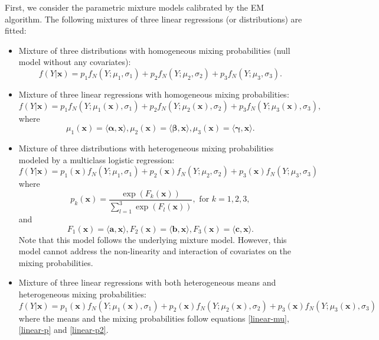\documentclass[11pt]{article}
\numberwithin{equation}{section}
\def\bx{\boldsymbol{x}}
\begin{document}
First, we  consider the parametric mixture models calibrated by the EM algorithm. The following mixtures of three linear regressions (or distributions) are fitted:
\begin{itemize}
	\item 	Mixture of three distributions with homogeneous mixing probabilities (null model without any covariates):
	\begin{equation}\label{gaussian-0}
		f(Y|\bx)=p_1f_N(Y;\mu_1,\sigma_1)+p_2f_N(Y;\mu_2,\sigma_2)+p_3f_N(Y;\mu_3,\sigma_3).
	\end{equation}

	\item 	Mixture of three linear regressions with homogeneous mixing probabilities:
\begin{equation}\label{gaussian-glm-mu}
	f(Y|\bx)=p_1f_N(Y;\mu_1(\bx),\sigma_1)+p_2f_N(Y;\mu_2(\bx),\sigma_2)+p_3f_N(Y;\mu_3(\bx),\sigma_3),
\end{equation}
where
\begin{equation}\label{linear-mu}
	\mu_1(\bx)=\langle\boldsymbol{\alpha},\bx\rangle, \mu_2(\bx)=\langle\boldsymbol{\beta},\bx\rangle,\mu_3(\bx)=\langle\boldsymbol{\gamma},\bx\rangle.
\end{equation}

\item 	Mixture of three distributions with heterogeneous mixing probabilities modeled by a multiclass logistic regression:
\begin{equation}\label{gaussian-glm-p}
	f(Y|\bx)=p_1(\bx)f_N(Y;\mu_1,\sigma_1)+p_2(\bx)f_N(Y;\mu_2,\sigma_2)+p_3(\bx)f_N(Y;\mu_3,\sigma_3)
\end{equation}
where
\begin{equation}\label{linear-p}
	p_k(\bx)=\frac{\exp\left(F_k(\bx)\right)}{\sum_{l=1}^{3}\exp\left(F_l(\bx)\right)}, \text{ for } k=1,2,3,
\end{equation}
and 
\begin{equation}\label{linear-p2}
	F_1(\bx)=\langle \boldsymbol{a},\bx\rangle, F_2(\bx)=\langle \boldsymbol{b},\bx\rangle,F_3(\bx)=\langle \boldsymbol{c},\bx\rangle.
\end{equation}
Note that this model follows the underlying mixture model. 
However, this model cannot address the non-linearity and interaction of covariates on the mixing probabilities.

	\item 	Mixture of three linear regressions with both heterogeneous means and heterogeneous mixing probabilities:
	\begin{equation}\label{gaussian-glm-b}
		f(Y|\bx)=p_1(\bx)f_N(Y;\mu_1(\bx),\sigma_1)+p_2(\bx)f_N(Y;\mu_2(\bx),\sigma_2)+p_3(\bx)f_N(Y;\mu_3(\bx),\sigma_3)
	\end{equation}
where the means and the mixing probabilities follow equations \eqref{linear-mu}, \eqref{linear-p} and \eqref{linear-p2}.
\end{itemize}
\end{document}
